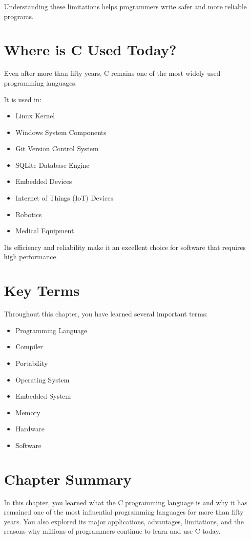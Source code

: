 \documentclass[12pt,openany]{book}
\begin{document}
Understanding these limitations helps programmers write safer and more reliable programs.

\section{Where is C Used Today?}

Even after more than fifty years, C remains one of the most widely used programming languages.

It is used in:

\begin{itemize}
    \item Linux Kernel
    \item Windows System Components
    \item Git Version Control System
    \item SQLite Database Engine
    \item Embedded Devices
    \item Internet of Things (IoT) Devices
    \item Robotics
    \item Medical Equipment
\end{itemize}

Its efficiency and reliability make it an excellent choice for software that requires high performance.
\section{Key Terms}

Throughout this chapter, you have learned several important terms:

\begin{itemize}
    \item Programming Language
    \item Compiler
    \item Portability
    \item Operating System
    \item Embedded System
    \item Memory
    \item Hardware
    \item Software
\end{itemize}

\section{Chapter Summary}

In this chapter, you learned what the C programming language is and why it has remained one of the most influential programming languages for more than fifty years. You also explored its major applications, advantages, limitations, and the reasons why millions of programmers continue to learn and use C today.
\end{document}
